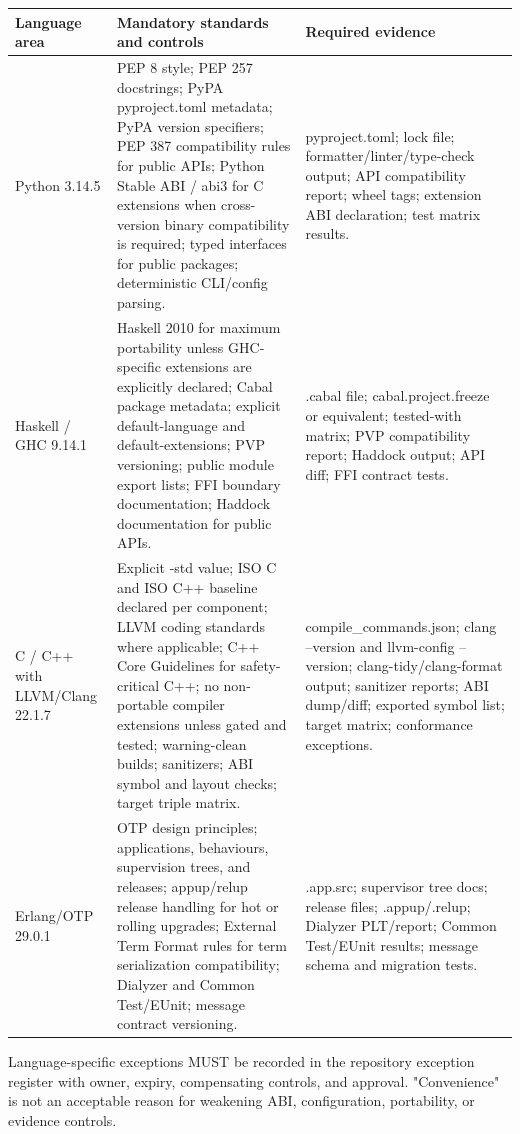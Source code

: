 \documentclass[11pt]{article}
\begin{document}
\begin{longtable}{|p{}|p{}|p{}|}
\hline
Language area & Mandatory standards and controls & Required evidence \\ \hline
Python 3.14.5 & PEP 8 style; PEP 257 docstrings; PyPA pyproject.toml metadata; PyPA version specifiers; PEP 387 compatibility rules for public APIs; Python Stable ABI / abi3 for C extensions when cross-version binary compatibility is required; typed interfaces for public packages; deterministic CLI/config parsing. & pyproject.toml; lock file; formatter/linter/type-check output; API compatibility report; wheel tags; extension ABI declaration; test matrix results. \\ \hline
Haskell / GHC 9.14.1 & Haskell 2010 for maximum portability unless GHC-specific extensions are explicitly declared; Cabal package metadata; explicit default-language and default-extensions; PVP versioning; public module export lists; FFI boundary documentation; Haddock documentation for public APIs. & .cabal file; cabal.project.freeze or equivalent; tested-with matrix; PVP compatibility report; Haddock output; API diff; FFI contract tests. \\ \hline
C / C++ with LLVM/Clang 22.1.7 & Explicit -std value; ISO C and ISO C++ baseline declared per component; LLVM coding standards where applicable; C++ Core Guidelines for safety-critical C++; no non-portable compiler extensions unless gated and tested; warning-clean builds; sanitizers; ABI symbol and layout checks; target triple matrix. & compile\_commands.json; clang --version and llvm-config --version; clang-tidy/clang-format output; sanitizer reports; ABI dump/diff; exported symbol list; target matrix; conformance exceptions. \\ \hline
Erlang/OTP 29.0.1 & OTP design principles; applications, behaviours, supervision trees, and releases; appup/relup release handling for hot or rolling upgrades; External Term Format rules for term serialization compatibility; Dialyzer and Common Test/EUnit; message contract versioning. & .app.src; supervisor tree docs; release files; .appup/.relup; Dialyzer PLT/report; Common Test/EUnit results; message schema and migration tests. \\ \hline
\end{longtable}
Language-specific exceptions MUST be recorded in the repository exception register with owner, expiry, compensating controls, and approval. "Convenience" is not an acceptable reason for weakening ABI, configuration, portability, or evidence controls.
\end{document}
